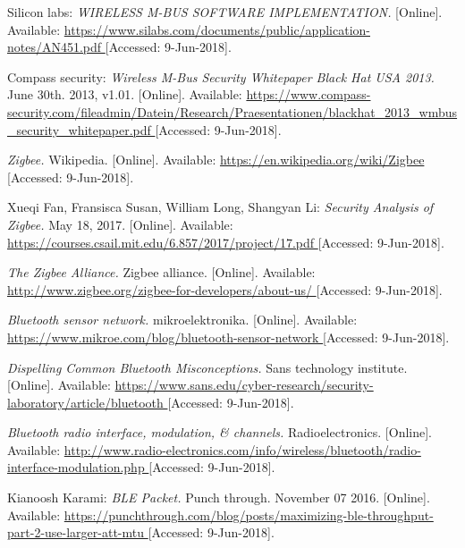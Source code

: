 \begin{thebibliography}{9}

Silicon labs: 
\textit{
WIRELESS M-BUS SOFTWARE IMPLEMENTATION.
}
[Online]. Available:
\url{
https://www.silabs.com/documents/public/application-notes/AN451.pdf
}
[Accessed: 9-Jun-2018].


Compass security:
\textit{
Wireless M-Bus Security Whitepaper Black Hat USA 2013.
}
June 30th. 2013, v1.01.
[Online]. Available:
\url{
https://www.compass-security.com/fileadmin/Datein/Research/Praesentationen/blackhat_2013_wmbus_security_whitepaper.pdf
}
[Accessed: 9-Jun-2018].


\textit{
Zigbee.
}
Wikipedia.
[Online]. Available:
\url{
https://en.wikipedia.org/wiki/Zigbee
}
[Accessed: 9-Jun-2018].



Xueqi Fan, Fransisca Susan, William Long, Shangyan Li: 
\textit{
Security Analysis of Zigbee.
}
May 18, 2017.
[Online]. Available:
\url{
https://courses.csail.mit.edu/6.857/2017/project/17.pdf
}
[Accessed: 9-Jun-2018].




\textit{
The Zigbee Alliance.
}
Zigbee alliance.
[Online]. Available:
\url{
http://www.zigbee.org/zigbee-for-developers/about-us/
}
[Accessed: 9-Jun-2018].



\textit{
Bluetooth sensor network.
}
mikroelektronika.
[Online]. Available:
\url{
https://www.mikroe.com/blog/bluetooth-sensor-network
}
[Accessed: 9-Jun-2018].

\textit{
Dispelling Common Bluetooth Misconceptions.
}
Sans technology institute.
[Online]. Available:
\url{
https://www.sans.edu/cyber-research/security-laboratory/article/bluetooth
}
[Accessed: 9-Jun-2018].

\textit{
Bluetooth radio interface, modulation, \& channels.
}
Radioelectronics.
[Online]. Available:
\url{
http://www.radio-electronics.com/info/wireless/bluetooth/radio-interface-modulation.php
}
[Accessed: 9-Jun-2018].

Kianoosh Karami: 
\textit{
BLE Packet.
} Punch through.  November 07 2016.  
[Online]. Available:
\url{
https://punchthrough.com/blog/posts/maximizing-ble-throughput-part-2-use-larger-att-mtu
}
[Accessed: 9-Jun-2018].


\end{thebibliography}

